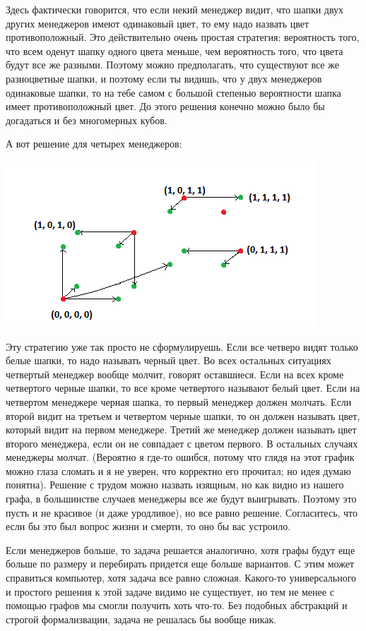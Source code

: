 Здесь фактически говорится, что если некий менеджер видит, что шапки двух других менеджеров имеют одинаковый цвет, то ему надо назвать цвет противоположный. Это действительно очень простая стратегия: вероятность того, что всем оденут шапку одного цвета меньше, чем вероятность того, что цвета будут все же разными. Поэтому можно предполагать, что существуют все же разноцветные шапки, и поэтому если ты видишь, что у двух менеджеров одинаковые шапки, то на тебе самом с большой степенью вероятности шапка имеет противоположный цвет. До этого решения конечно можно было бы догадаться и без многомерных кубов.

А вот решение для четырех менеджеров:

\includegraphics{sol4.png}

Эту стратегию уже так просто не сформулируешь. Если все четверо видят только белые шапки, то надо называть черный цвет. Во всех остальных ситуациях четвертый менеджер вообще молчит, говорят оставшиеся. Если на всех кроме четвертого черные шапки, то все кроме четвертого называют белый цвет. Если на четвертом менеджере черная шапка, то первый менеджер должен молчать. Если второй видит на третьем и четвертом черные шапки, то он должен называть цвет, который видит на первом менеджере. Третий же менеджер должен называть цвет второго менеджера, если он не совпадает с цветом первого. В остальных случаях менеджеры молчат. (Вероятно я где-то ошибся, потому что глядя на этот график можно глаза сломать и я не уверен, что корректно его прочитал; но идея думаю понятна). Решение с трудом можно назвать изящным, но как видно из нашего графа, в большинстве случаев менеджеры все же будут выигрывать. Поэтому это пусть и не красивое (и даже уродливое), но все равно решение. Согласитесь, что если бы это был вопрос жизни и смерти, то оно бы вас устроило.

Если менеджеров больше, то задача решается аналогично, хотя графы будут еще больше по размеру и перебирать придется еще больше вариантов. С этим может справиться компьютер, хотя задача все равно сложная. Какого-то универсального и простого решения к этой задаче видимо не существует, но тем не менее с помощью графов мы смогли получить хоть что-то. Без подобных абстракций и строгой формализвации, задача не решалась бы вообще никак.

